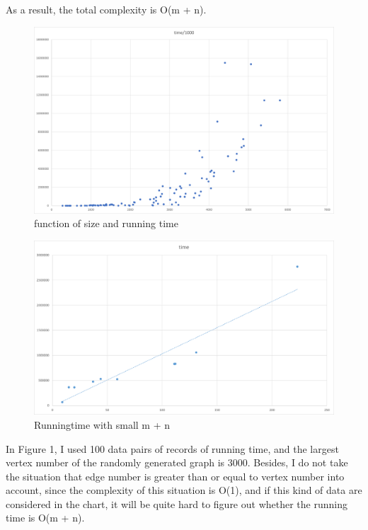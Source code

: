 \documentclass[]{article}
\begin{document}
	\noindent As a result, the total complexity is O(m + n).  \\
	
	\begin{figure}[H]
		\centering
		\includegraphics[width=0.9\linewidth]{screen/Picture1}
		\caption{function of size and running time}
		\label{fig:function-of-size-and-running-time}
	\end{figure}

	\begin{figure}[H]
		\centering
		\includegraphics[width=0.9\linewidth]{screen/Picture2}
		\caption{Runningtime with small m + n}
		\label{fig:picture2}
	\end{figure}
	
	\noindent In Figure 1, I used 100 data pairs of records of running time, and the largest vertex number of the randomly generated graph is 3000. Besides, I do not take the situation that edge number is greater than or equal to vertex number into account, since the complexity of this situation is O(1), and if this kind of data are considered in the chart, it will be quite hard to figure out whether the running time is O(m + n). \\
	
\end{document}
